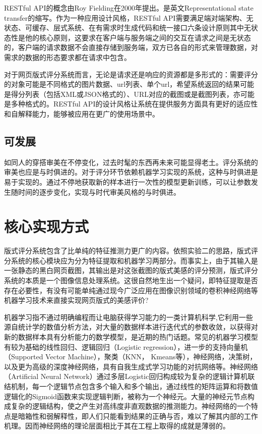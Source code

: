 RESTful API的概念由Roy Fielding在2000年提出。是英文Representational state transfer的缩写。作为一种应用设计风格，RESTful API需要满足端对端架构、无状态、可缓存、层式系统、在有需求时生成代码和统一接口六条设计原则其中无状态性是他的核心原则，这要求在客户端与服务端之间的交互在请求之间是无状态的，客户端的请求数据不会直接存储到服务端，双方已各自的形式来管理数据，对需求的数据的形态要求都在请求中包含。

对于网页版式评分系统而言，无论是请求还是响应的资源都是多形式的：需要评分的对象可能是不同格式的图片数据、url列表、单个url，希望系统返回的结果可能是得分列表（包括XML或JSON格式的）、URL对应的截图或是截图列表，亦可能是多种格式的。RESTful API的设计风格让系统在提供服务方面具有更好的适应性和自解释能力，能够被应用在更广的使用场景中。

\subsection{可发展}
如同人的穿搭审美在不停变化，过去时髦的东西再未来可能显得老土。评分系统的审美也应是与时俱进的。对于评分环节依赖机器学习实现的系统，这种与时俱进是易于实现的。通过不停地获取新的样本进行一次性的模型更新训练，可以让参数发生随时间的逐步变化，实现与时代审美风格的与时俱进。

\section{核心实现方式}
版式评分系统包含了比单纯的特征推测力更广的内容。依照实验二的思路，版式评分系统的核心模块应为分为特征提取和机器学习两部分。而事实上，由于其输入是一张静态的黑白网页截图，其输出是对这张截图的版式美感的评分预测，版式评分系统的本质是一个图像信息处理系统。这很自然地生出一个疑问，即特征提取是否存在必要性，有没有可能单纯通过现今广泛应用在图像识别领域的卷积神经网络等机器学习技术来直接实现网页版式的美感评价?

机器学习指不通过明确编程而让电脑获得学习能力的一类计算机科学\cite{Koza1996},它利用一些源自统计学的数值分析方法，对大量的数据样本进行迭代式的参数收敛，以获得对新的数据样本具有分析能力的数学模型，是近期的热门话题。常见的机器学习模型有较为基础的线性回归、逻辑回归（Logistic regression），进一步的支持向量机（Supported Vector Machine），聚类（KNN， Kmeans等），神经网络，决策树，以及更为高级的深度神经网络，具有自我生成式学习功能的对抗网络等。神经网络（Artificial Neural Network）通过多层Logistic回归构成较为复杂的逻辑计算机联结机制，每一个逻辑节点包含多个输入和多个输出，通过线性的矩阵运算和将数值逻辑化的Sigmoid函数来实现逻辑判断，被称为一个神经元。大量的神经元节点构成复杂的逻辑结构，使之产生对高纬度非直观数据的推测能力。神经网络的一个特点是暗箱性和弱解释性，即人们只能看到结果的正确与否，难以了解其内部的工作机理。因而神经网络的理论层面相比于其在工程上取得的成就是薄弱的。

